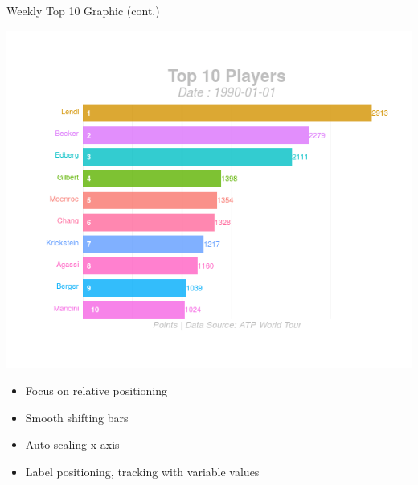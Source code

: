 \documentclass[ignorenonframetext,]{beamer}
\providecommand{\tightlist}{%
  \setlength{\itemsep}{0pt}\setlength{\parskip}{0pt}}
\begin{document}
\begin{frame}{Weekly Top 10 Graphic (cont.)}
\protect\hypertarget{weekly-top-10-graphic-cont.-1}{}

\includegraphics{gganim_test3.gif}

\begin{itemize}[<+->]
\tightlist
\item
  Focus on relative positioning
\item
  Smooth shifting bars
\item
  Auto-scaling x-axis
\item
  Label positioning, tracking with variable values
\end{itemize}

\end{frame}
\end{document}
